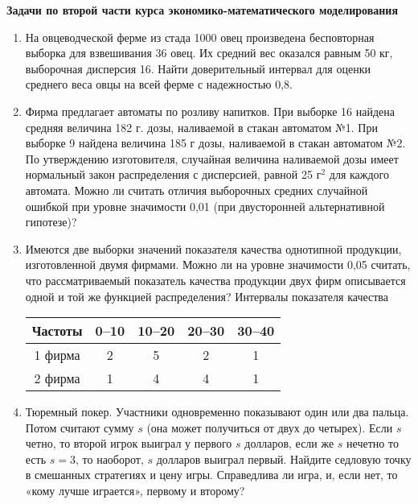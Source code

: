 \documentclass[a4paper,14pt]{extarticle}
\begin{document}
{
\bfseries   Задачи по второй части курса экономико-математического моделирования
\par\vspace{1mm}
}


\begin{enumerate}
    \item  На овцеводческой ферме из стада 1000 овец произведена бесповторная выборка для взвешивания 36 овец. Их средний вес оказался равным 50 кг, выборочная дисперсия 16. Найти доверительный интервал для оценки среднего веса овцы на всей ферме с надежностью 0,8.

    \item Фирма предлагает автоматы по розливу напитков. При выборке 16 найдена средняя величина 182 г. дозы, наливаемой в стакан автоматом №1. При выборке 9 найдена величина 185 г дозы, наливаемой в стакан автоматом №2. По утверждению изготовителя, случайная величина наливаемой дозы имеет нормальный закон распределения с дисперсией, равной 25 г$^2$ для каждого автомата. Можно ли считать отличия выборочных средних случайной ошибкой при уровне значимости 0,01 (при двусторонней альтернативной гипотезе)?
    
    
    \item  Имеются две выборки значений показателя качества однотипной продукции, изготовленной двумя фирмами. Можно ли на уровне значимости 0,05 считать, что рассматриваемый показатель качества продукции двух фирм описывается одной и той же функцией распределения?
    Интервалы показателя качества

    {\centering
    \begin{tabular}{c|cccc}
        Частоты & 0--10& 10--20   &20--30 & 30--40 \\
        \hline
        1 фирма &  2 & 5 & 2 & 1 \\
        2 фирма & 1 & 4 & 4 & 1  \\
    \end{tabular}\par}

    \item Тюремный покер. Участники одновременно показывают один или два пальца. Потом считают сумму $s$ (она может получиться от двух до четырех). 
    Если $s$ четно, то второй игрок выиграл у первого $s$ долларов, если же $s$ нечетно то есть $s = 3$, то наоборот, $s$ долларов выиграл
    первый. Найдите седловую точку в смешанных стратегиях и цену игры. Справедлива ли игра, и, если нет, то «кому лучше играется», первому и второму?


\end{enumerate}
\end{document}
